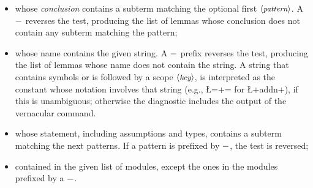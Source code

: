 \begin{itemize}
\item whose \emph{conclusion} contains a subterm matching the optional
  first $\langle\mbox{\itshape\rmfamily\small pattern}\rangle$. A $\C{-}$ reverses the test, producing the list
  of lemmas whose conclusion does not contain any subterm matching
  the pattern;
\item whose name contains the given string. A $\C{-}$ prefix reverses
  the test, producing the list of lemmas whose name does not contain the
  string. A string that contains symbols or
is followed by a scope $\langle\mbox{\itshape\rmfamily\small key}\rangle$, is interpreted as the constant whose
notation involves that string (e.g., \L=+= for \L+addn+), if this is
unambiguous; otherwise the diagnostic includes the output of the
 vernacular command.

\item whose statement, including assumptions and types, contains a
  subterm matching the next patterns. If a pattern is prefixed by
  $\C{-}$, the test is reversed;
\item contained in the given list of modules, except the ones in the
  modules prefixed by a $\C{-}$.
\end{itemize}

